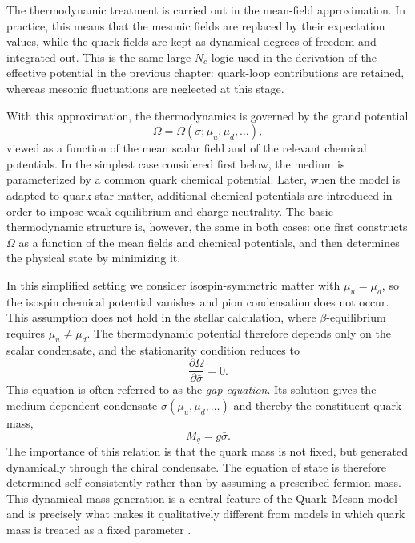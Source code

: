 The thermodynamic treatment is carried out in the mean-field
approximation. In practice, this means that the mesonic fields are
replaced by their expectation values, while the quark fields are kept
as dynamical degrees of freedom and integrated out. This is the same
large-$N_c$ logic used in the derivation of the effective potential in
the previous chapter: quark-loop contributions are retained, whereas
mesonic fluctuations are neglected at this stage. 

With this approximation, the thermodynamics is governed by the grand
potential
\begin{equation}
\Omega = \Omega(\bar{\sigma}; \mu_u,\mu_d,\ldots),
\end{equation}
viewed as a function of the mean scalar field and of the relevant
chemical potentials. In the simplest case considered first below, the
medium is parameterized by a common quark chemical potential. Later,
when the model is adapted to quark-star matter, additional chemical
potentials are introduced in order to impose weak equilibrium and
charge neutrality. The basic thermodynamic structure is, however, the
same in both cases: one first constructs $\Omega$ as a function of the
mean fields and chemical potentials, and then determines the physical
state by minimizing it.

In this simplified setting we consider isospin-symmetric matter with
\(\mu_u = \mu_d\), so the isospin chemical potential vanishes and
pion condensation does not occur. This assumption does not hold in
the stellar calculation, where $\beta$-equilibrium requires
$\mu_u \neq \mu_d$.
The thermodynamic potential
therefore depends only on the scalar condensate, and the
stationarity condition reduces to
\begin{equation}
\frac{\partial \Omega}{\partial \bar{\sigma}} = 0.
\label{eq:qs_gap_eq}
\end{equation}
This equation is often referred to as the \emph{gap equation}. Its
solution gives the medium-dependent condensate
$\bar{\sigma}(\mu_u,\mu_d,\ldots)$ and thereby the constituent quark
mass,
\begin{equation}
M_q = g\bar{\sigma}.
\label{eq:qs_constituent_mass}
\end{equation}
The importance of this relation is that the quark mass is not fixed,
but generated dynamically through the chiral condensate. The equation
of state is therefore determined self-consistently rather than by
assuming a prescribed fermion mass. This dynamical mass generation is a
central feature of the Quark--Meson model and is precisely what makes
it qualitatively different from models in which quark mass is treated as
a fixed parameter \cite{Buballa2005,Schmitt2010,sletmoen2022}.

